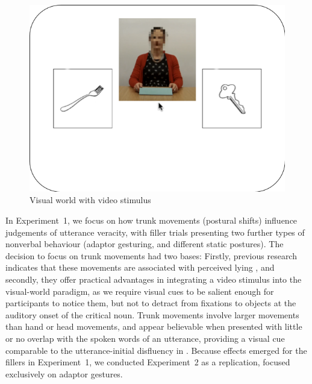 \documentclass[a4paper,man,natbib]{apa6}
\begin{document}
\begin{figure}[Ht]
  \centering
	\includegraphics[width=\linewidth]{./img/e7_layout.png}
  \caption{Visual world with video stimulus}
  \label{fig:v1_layout}
\end{figure}

In Experiment~1, we focus on how trunk movements (postural shifts) influence judgements of utterance veracity, with filler trials presenting two further types of nonverbal behaviour (adaptor gesturing, and different static postures).
The decision to focus on trunk movements had two bases: Firstly, previous research indicates that these movements are associated with perceived lying \citep{Vrij1996a}, and secondly, they offer practical advantages in integrating a video stimulus into the visual-world paradigm, as we require visual cues to be salient enough for participants to notice them, but not to detract from fixations to objects at the auditory onset of the critical noun.
Trunk movements involve larger movements than hand or head movements, and appear believable when presented with little or no overlap with the spoken words of an utterance, providing a visual cue comparable to the utterance-initial disfluency in \citet{Loy2017}.
Because effects emerged for the fillers in Experiment~1, we conducted Experiment~2 as a replication, focused exclusively on adaptor gestures.
\end{document}

